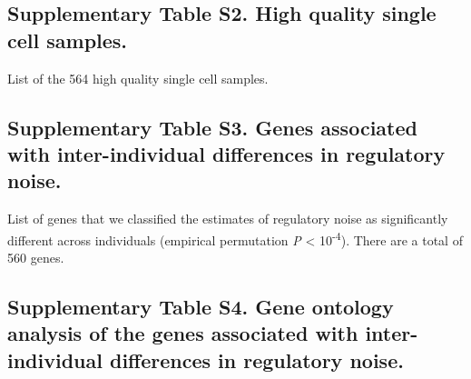 \subsection{Supplementary Table S2. High quality single cell
samples.}\label{supplementary-table-s2.-high-quality-single-cell-samples.}

List of the 564 high quality single cell samples.

\subsection{Supplementary Table S3. Genes associated with
inter-individual differences in regulatory
noise.}\label{supplementary-table-s3.-genes-associated-with-inter-individual-differences-in-regulatory-noise.}

List of genes that we classified the estimates of regulatory noise as
significantly different across individuals (empirical permutation
\emph{P} \textless{} 10\textsuperscript{-4}). There are a total of 560
genes.

\subsection{Supplementary Table S4. Gene ontology analysis of the
genes associated with inter-individual differences in regulatory
noise.}\label{supplementary-table-s4.-gene-ontology-analysis-of-the-genes-associated-with-inter-individual-differences-in-regulatory-noise.}

